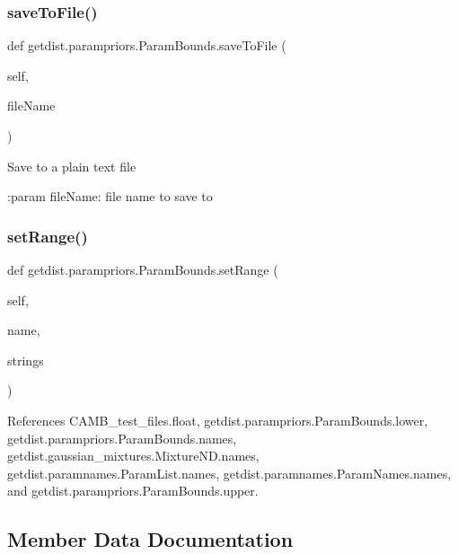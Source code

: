\subsubsection{\texorpdfstring{save\+To\+File()}{saveToFile()}}
{\footnotesize\ttfamily def getdist.\+parampriors.\+Param\+Bounds.\+save\+To\+File (\begin{DoxyParamCaption}\item[{}]{self,  }\item[{}]{file\+Name }\end{DoxyParamCaption})}

\begin{DoxyVerb}Save to a plain text file

:param fileName: file name to save to
\end{DoxyVerb}
 \mbox{\label{classgetdist_1_1parampriors_1_1ParamBounds_aa3a528fdbc3800f5285a839de6339c0e}} 
\subsubsection{\texorpdfstring{set\+Range()}{setRange()}}
{\footnotesize\ttfamily def getdist.\+parampriors.\+Param\+Bounds.\+set\+Range (\begin{DoxyParamCaption}\item[{}]{self,  }\item[{}]{name,  }\item[{}]{strings }\end{DoxyParamCaption})}



References C\+A\+M\+B\+\_\+test\+\_\+files.\+float, getdist.\+parampriors.\+Param\+Bounds.\+lower, getdist.\+parampriors.\+Param\+Bounds.\+names, getdist.\+gaussian\+\_\+mixtures.\+Mixture\+N\+D.\+names, getdist.\+paramnames.\+Param\+List.\+names, getdist.\+paramnames.\+Param\+Names.\+names, and getdist.\+parampriors.\+Param\+Bounds.\+upper.



\subsection{Member Data Documentation}
\mbox{\label{classgetdist_1_1parampriors_1_1ParamBounds_ac0e21ca4d3868b24d16433732140ca89}} 
